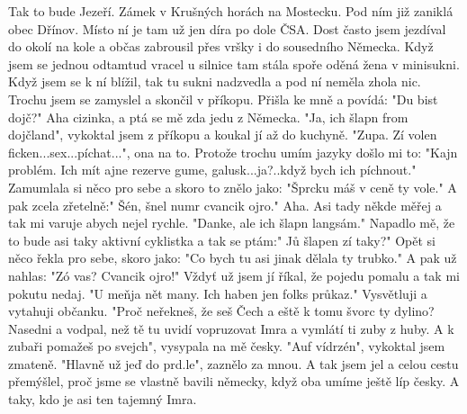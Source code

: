 
Tak to bude Jezeří. Zámek v Krušných horách na Mostecku. Pod ním již
zaniklá obec Dřínov. Místo ní je tam už jen díra po dole ČSA. Dost
často jsem jezdíval do okolí na kole a občas zabrousil přes vršky i do
sousedního Německa. Když jsem se jednou odtamtud vracel u silnice tam
stála spoře oděná žena v minisukni. Když jsem se k ní blížil, tak tu
sukni nadzvedla a pod ní neměla zhola nic. Trochu jsem se zamyslel a
skončil v příkopu. Přišla ke mně a povídá: "Du bist dojč?" Aha
cizinka, a ptá se mě zda jedu z Německa. "Ja, ich šlapn from
dojčland", vykoktal jsem z příkopu a koukal jí až do kuchyně. "Zupa.
Zí volen ficken...sex...píchat...", ona na to. Protože trochu umím
jazyky došlo mi to: "Kajn problém. Ich mít ajne rezerve gume,
galusk...ja?..když bych ich píchnout." Zamumlala si něco pro sebe a
skoro to znělo jako: "Šprcku máš v ceně ty vole." A pak zcela
zřetelně:" Šén, šnel numr cvancik ojro." Aha. Asi tady někde měřej a
tak mi varuje abych nejel rychle. "Danke, ale ich šlapn langsám."
Napadlo mě, že to bude asi taky aktivní cyklistka a tak se ptám:" Jů
šlapen zí taky?" Opět si něco řekla pro sebe, skoro jako: "Co bych tu
asi jinak dělala ty trubko." A pak už nahlas: "Zó vas? Cvancik ojro!"
Vždyť už jsem jí říkal, že pojedu pomalu a tak mi pokutu nedaj. "U
meňja nět many. Ich haben jen folks průkaz." Vysvětluji a vytahuji
občanku. "Proč neřekneš, že seš Čech a eště k tomu švorc ty dylino?
Nasedni a vodpal, než tě tu uvidí vopruzovat Imra a vymlátí ti zuby z
huby. A k zubaři pomažeš po svejch", vysypala na mě česky. "Auf
vídrzén", vykoktal jsem zmateně. "Hlavně už jeď do prd.le", zaznělo
za mnou. A tak jsem jel a celou cestu přemýšlel, proč jsme se vlastně
bavili německy, když oba umíme ještě líp česky. A taky, kdo je asi ten
tajemný Imra.

